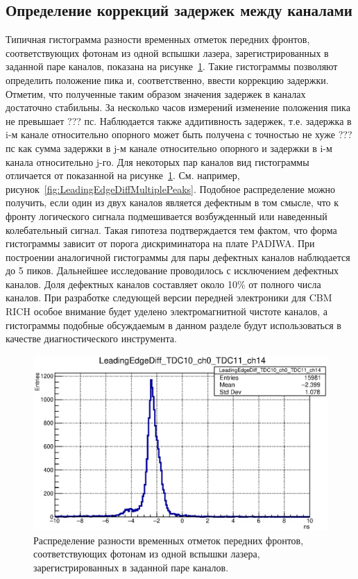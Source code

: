 \subsection{Определение коррекций задержек между каналами}

Типичная гистограмма разности временных отметок передних фронтов, соответствующих фотонам из одной вспышки лазера, зарегистрированных в заданной паре каналов, показана на рисунке~\ref{fig:TypicalLeadingEdgeDiff}. Такие гистограммы позволяют определить положение пика и, соответственно, ввести коррекцию задержки. Отметим, что полученные таким образом значения задержек в каналах достаточно стабильны. За несколько часов измерений изменение положения пика не превышает ??? пс. Наблюдается также аддитивность задержек, т.е. задержка в i-м канале относительно опорного может быть получена с точностью не хуже ??? пс как сумма задержки в j-м канале относительно опорного и задержки в i-м канала относительно j-го. Для некоторых пар каналов вид гистограммы отличается от показанной на рисунке~\ref{fig:TypicalLeadingEdgeDiff}. См. например, рисунок~\ref{fig:LeadingEdgeDiffMultiplePeaks}. Подобное распределение можно получить, если один из двух каналов является дефектным в том смысле, что к фронту логического сигнала подмешивается возбужденный или наведенный колебательный сигнал. Такая гипотеза подтверждается тем фактом, что форма гистограммы зависит от порога дискриминатора на плате PADIWA. При построении аналогичной гистограммы для пары дефектных каналов наблюдается до 5 пиков. Дальнейшее исследование проводилось с исключением дефектных каналов. Доля дефектных каналов составляет около 10\% от полного числа каналов. При разработке следующей версии передней электроники для CBM RICH особое внимание будет уделено электромагнитной чистоте каналов, а гистограммы подобные обсуждаемым в данном разделе будут использоваться в качестве диагностического инструмента.

\begin{figure}
\includegraphics[width=1.0\textwidth]{pictures/LeadingEdgeDiff_TDC10_ch0_TDC11_ch14.eps}
\caption{Распределение разности временных отметок передних фронтов, соответствующих фотонам из одной вспышки лазера, зарегистрированных в заданной паре каналов.}
\label{fig:TypicalLeadingEdgeDiff}
\end{figure}

